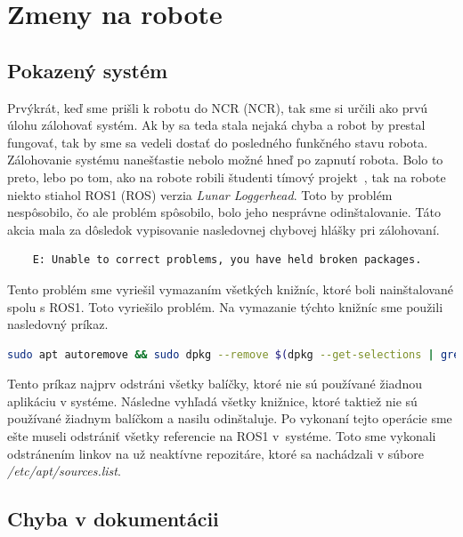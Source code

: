 \section{Zmeny na robote}

\subsection{Pokazený systém}
\label{subsec:brokenSystem}

Prvýkrát, keď sme prišli k robotu do NCR (\acrlong{NCR}), tak sme si určili ako prvú úlohu zálohovať systém. Ak by sa teda stala nejaká chyba
a robot by prestal fungovať, tak by sme sa vedeli dostať do posledného funkčného stavu robota. Zálohovanie systému nanešťastie nebolo možné
hneď po zapnutí robota. Bolo to preto, lebo po tom, ako na robote robili študenti tímový projekt~\cite{timovyProjekt}, tak na robote niekto
stiahol ROS1 (\acrlong{ROS}) verzia \textit{Lunar Loggerhead}. Toto by problém nespôsobilo, čo ale problém spôsobilo, bolo jeho nesprávne odinštalovanie.
Táto akcia mala za dôsledok vypisovanie nasledovnej chybovej hlášky pri zálohovaní.

\begin{lstlisting}
	E: Unable to correct problems, you have held broken packages.
\end{lstlisting}

Tento problém sme vyriešil vymazaním všetkých knižníc, ktoré boli nainštalované spolu s ROS1. Toto vyriešilo problém. Na vymazanie týchto
knižníc sme použili nasledovný príkaz.

\begin{lstlisting}[language=bash]
	sudo apt autoremove && sudo dpkg --remove $(dpkg --get-selections | grep hold)
\end{lstlisting}

Tento príkaz najprv odstráni všetky balíčky, ktoré nie sú používané žiadnou aplikáciu v systéme. Následne vyhľadá všetky knižnice,
ktoré taktiež nie sú používané žiadnym balíčkom a nasilu odinštaluje. Po vykonaní tejto operácie sme ešte museli odstrániť všetky referencie
na ROS1 v~systéme. Toto sme vykonali odstránením linkov na už neaktívne repozitáre, ktoré sa nachádzali v súbore \textit{/etc/apt/sources.list}.

\subsection{Chyba v dokumentácii}
\label{subsec:documentationIssue}

